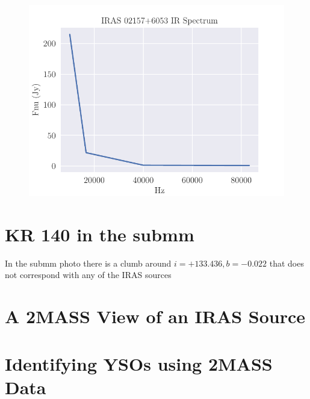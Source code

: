 \documentclass[]{article}
\begin{document}
\begin{figure}
	\centering
	\includegraphics[]{figs/spectrum.pdf}
\end{figure}


\section{KR 140 in the submm}

In the submm photo there is a clumb around $i=+133.436, b=-0.022$ that does not correspond with any of the IRAS sources

\section{A 2MASS View of an IRAS Source}



\section{Identifying YSOs using 2MASS Data}
\end{document}
